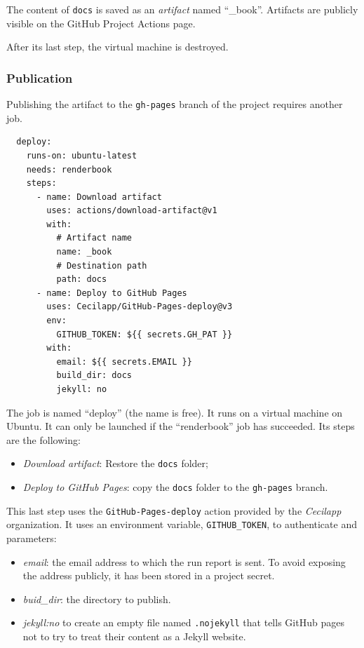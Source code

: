 \documentclass[
  12pt,
  american,
  a4paper,
  extrafontsizes,onecolumn,openright
  ]{memoir}
\providecommand{\tightlist}{%
  \setlength{\itemsep}{0pt}\setlength{\parskip}{0pt}}
\begin{document}
The content of \texttt{docs} is saved as an \emph{artifact} named ``\_book''.
Artifacts are publicly visible on the GitHub Project Actions page.

After its last step, the virtual machine is destroyed.

\hypertarget{publication}{%
\subsubsection{Publication}\label{publication}}

Publishing the artifact to the \texttt{gh-pages} branch of the project requires another job.

\begin{verbatim}
  deploy:
    runs-on: ubuntu-latest
    needs: renderbook
    steps:
      - name: Download artifact
        uses: actions/download-artifact@v1
        with:
          # Artifact name
          name: _book
          # Destination path
          path: docs
      - name: Deploy to GitHub Pages
        uses: Cecilapp/GitHub-Pages-deploy@v3
        env:
          GITHUB_TOKEN: ${{ secrets.GH_PAT }}
        with:
          email: ${{ secrets.EMAIL }}
          build_dir: docs
          jekyll: no
\end{verbatim}

The job is named \enquote{deploy} (the name is free).
It runs on a virtual machine on Ubuntu.
It can only be launched if the \enquote{renderbook} job has succeeded.
Its steps are the following:

\begin{itemize}
\tightlist
\item
  \emph{Download artifact}: Restore the \texttt{docs} folder;
\item
  \emph{Deploy to GitHub Pages}: copy the \texttt{docs} folder to the \texttt{gh-pages} branch.
\end{itemize}

This last step uses the \texttt{GitHub-Pages-deploy} action provided by the \emph{Cecilapp} organization.
It uses an environment variable, \texttt{GITHUB\_TOKEN}, to authenticate and parameters:

\begin{itemize}
\tightlist
\item
  \emph{email}: the email address to which the run report is sent.
  To avoid exposing the address publicly, it has been stored in a project secret.
\item
  \emph{buid\_dir}: the directory to publish.
\item
  \emph{jekyll:no} to create an empty file named \texttt{.nojekyll} that tells GitHub pages not to try to treat their content as a Jekyll website.
\end{itemize}
\end{document}
